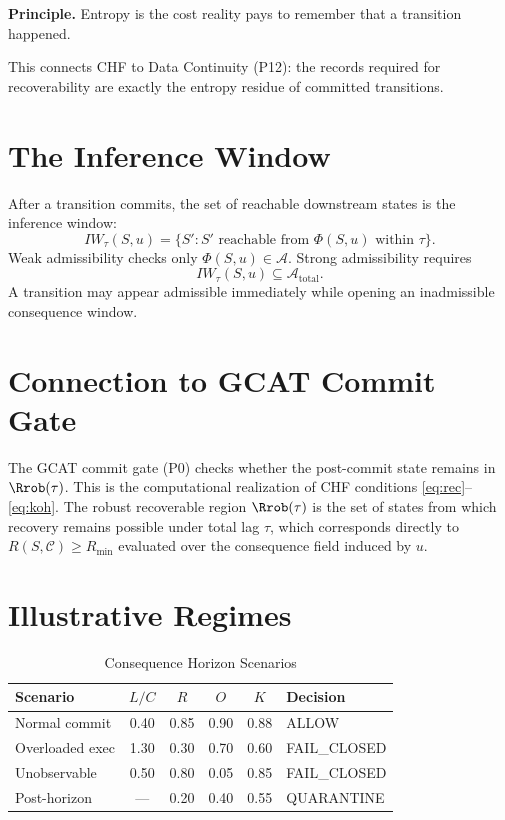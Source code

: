\documentclass[letterpaper,10pt,conference]{ieeeconf}
\newcommand{\A}{\mathcal{A}}
\newcommand{\Phiop}{\Phi}
\newcommand{\Cf}{\mathcal{C}}
\newcommand{\Rec}{R}
\newcommand{\Obs}{O}
\newcommand{\Koh}{K}
\begin{document}
\textbf{Principle.} Entropy is the cost reality pays to remember that a transition happened.

This connects CHF to Data Continuity (P12): the records required for recoverability are exactly the entropy residue of committed transitions.

\section{The Inference Window}

After a transition commits, the set of reachable downstream states is the inference window:
\[
IW_\tau(S, u) = \{S' : S' \text{ reachable from } \Phiop(S,u) \text{ within } \tau\}.
\]
Weak admissibility checks only $\Phiop(S,u) \in \A$. Strong admissibility requires
\[
IW_\tau(S,u) \subseteq \A_{\text{total}}.
\]
A transition may appear admissible immediately while opening an inadmissible consequence window.

\section{Connection to GCAT Commit Gate}

The GCAT commit gate (P0) checks whether the post-commit state remains in $\Rrob(\tau)$. This is the computational realization of CHF conditions \eqref{eq:rec}--\eqref{eq:koh}. The robust recoverable region $\Rrob(\tau)$ is the set of states from which recovery remains possible under total lag $\tau$, which corresponds directly to $\Rec(S,\Cf) \ge R_{\min}$ evaluated over the consequence field induced by $u$.

\section{Illustrative Regimes}

\begin{table}[h]
\centering
\caption{Consequence Horizon Scenarios}
\begin{tabular}{lccccl}
\hline
Scenario & $L/C$ & $\Rec$ & $\Obs$ & $\Koh$ & Decision \\
\hline
Normal commit & 0.40 & 0.85 & 0.90 & 0.88 & ALLOW \\
Overloaded exec & 1.30 & 0.30 & 0.70 & 0.60 & FAIL\_CLOSED \\
Unobservable & 0.50 & 0.80 & 0.05 & 0.85 & FAIL\_CLOSED \\
Post-horizon & --- & 0.20 & 0.40 & 0.55 & QUARANTINE \\
\hline
\end{tabular}
\end{table}
\end{document}
